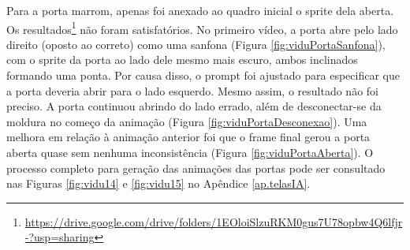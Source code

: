 Para a porta marrom, apenas foi anexado ao quadro inicial o sprite dela aberta. Os resultados\footnote{\url{https://drive.google.com/drive/folders/1EOloiSlzuRKM0gus7U78opbw4Q6lfjr-?usp=sharing}} não foram satisfatórios. No primeiro vídeo, a porta abre pelo lado direito (oposto ao correto) como uma sanfona (Figura \ref{fig:viduPortaSanfona}), com o sprite da porta ao lado dele mesmo mais escuro, ambos inclinados formando uma ponta. Por causa disso, o prompt foi ajustado para especificar que a porta deveria abrir para o lado esquerdo. Mesmo assim, o resultado não foi preciso. A porta continuou abrindo do lado errado, além de desconectar-se da moldura no começo da animação (Figura \ref{fig:viduPortaDesconexao}). Uma melhora em relação à animação anterior foi que o frame final gerou a porta aberta quase sem nenhuma inconsistência (Figura \ref{fig:viduPortaAberta}). O processo completo para geração das animações das portas pode ser consultado nas Figuras \ref{fig:vidu14} e \ref{fig:vidu15} no Apêndice \ref{ap.telasIA}.

